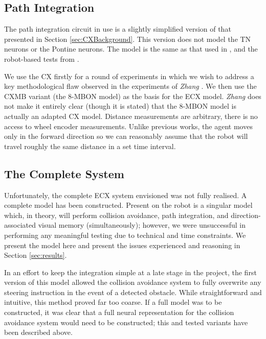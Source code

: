 \documentclass[a4paper,11pt,twoside,openright]{article}
\begin{document}

\subsection{ Path Integration }
The path integration circuit in use is a slightly simplified version of that
presented in Section \ref{sec:CXBackground}. This version does not model the
TN neurons or the Pontine neurons. The model is the same as that used in
\cite{Scimeca2017, Zhang2017}, and the robot-based tests from \cite{Stone2017}.
\newline\par

We use the CX firstly for a round of experiments in which we wish to address a
key methodological flaw observed in the experiments of \textit{Zhang}
\cite{Zhang2017}. We then use the CXMB variant (the 8-MBON model)
as the basis for the ECX model. \textit{Zhang} does not make it entirely clear
(though it is stated) that the 8-MBON model is actually an adapted CX model.
Distance measurements are arbitrary, there is no access to wheel encoder
measurements. Unlike previous works, the agent moves only in the forward
direction so we can reasonably assume that the robot will travel roughly the same
distance in a set time interval.

\subsection{ The Complete System}
Unfortunately, the complete ECX system envisioned was not fully realised. A
complete model has been constructed. Present on the robot is a singular model
which, in theory, will perform collision avoidance, path integration, and
direction-associated visual memory (simultaneously); however, we were
unsuccessful in performing any meaningful testing due to technical and time
constraints. We present the model here and present the issues experienced and
reasoning in Section \ref{sec:results}.
\newline\par

In an effort to keep the integration simple at a late stage in the project,
the first version of this model allowed the collision avoidance system to fully
overwrite any steering instruction in the event of a detected obstacle. While
straightforward and intuitive, this method proved far too coarse. If a full
model was to be constructed, it was clear that a full neural representation
for the collision avoidance system would need to be constructed; this and
tested variants have been described above.
\newline\par
\end{document}
